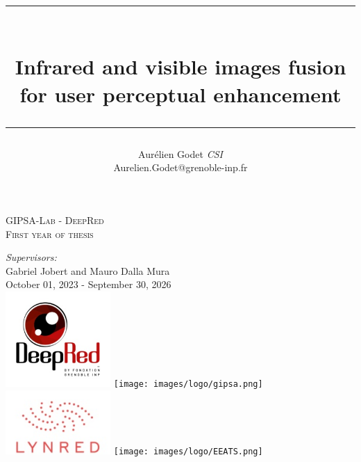 \documentclass[12pt, english]{article}
\begin{document}
    \newcommand{\HRule}{\rule{\linewidth}{0.5mm}} 							%
    \newlength{\imagesize} \setlength{\imagesize}{8cm}
    \newlength{\bigimagesize} \setlength{\bigimagesize}{12cm}
    \newlength{\smallimagesize} \setlength{\smallimagesize}{6cm}
    \newlength{\halfimagesize} \setlength{\halfimagesize}{4cm}
    \setlength\intextsep{4pt}
    
    \begin{titlepage}
    
    \title{\HRule{} \huge \bfseries  \\ Infrared and visible images fusion for user perceptual enhancement \\ \HRule}
    \author{Aurélien Godet \textit{CSI} \\ Aurelien.Godet@grenoble-inp.fr}

    \maketitle
    \center{}

    \textsc{\LARGE GIPSA-Lab - DeepRed}\\[1cm]
    \textsc{\large First year of thesis}\\[0.5cm] 
    
    \large
    
    \emph{Supervisors:}\\
    Gabriel Jobert and Mauro Dalla Mura
    \\[1.5cm]
    
    {\large October 01, 2023 - September 30, 2026
    }\\[5cm]
    \includegraphics[width=4cm]{images/logo/Deepred.jpg}
    \texttt{[image: images/logo/gipsa.png]}               
    \includegraphics[width=4cm]{images/logo/Lynred.png}
    \texttt{[image: images/logo/EEATS.png]}
    \vfill 
    \end{titlepage}
    
\end{document}
